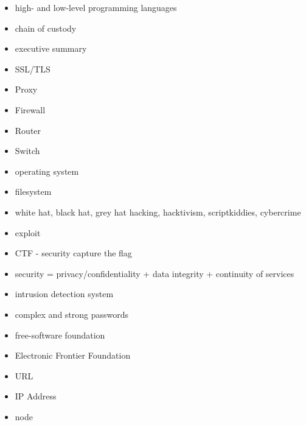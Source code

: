 \documentclass[letterpaper,10pt,english]{sphinxmanual}
\begin{document}
\begin{itemize}
\item {} 
high- and low-level programming languages

\item {} 
chain of custody

\item {} 
executive summary

\item {} 
SSL/TLS

\item {} 
Proxy

\item {} 
Firewall

\item {} 
Router

\item {} 
Switch

\item {} 
operating system

\item {} 
filesystem

\item {} 
white hat, black hat, grey hat hacking, hacktivism, scriptkiddies, cybercrime

\item {} 
exploit

\item {} 
CTF - security capture the flag

\item {} 
security = privacy/confidentiality + data integrity + continuity of services

\item {} 
intrusion detection system

\item {} 
complex and strong passwords

\item {} 
free-software foundation

\item {} 
Electronic Frontier Foundation

\item {} 
URL

\item {} 
IP Address

\item {} 
node

\end{itemize}

\end{document}
